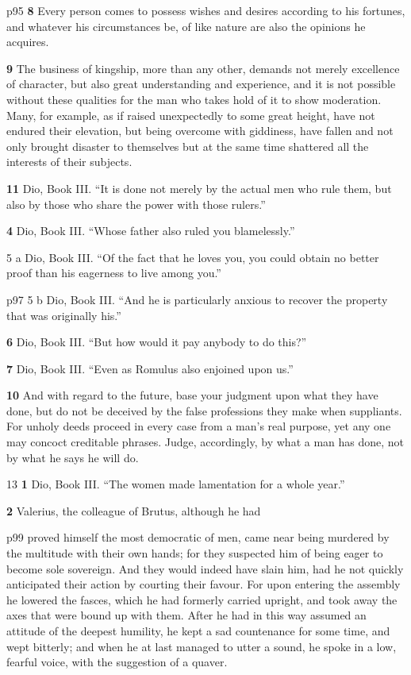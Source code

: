 p95
\textbf{8}
Every person comes to possess wishes and desires according to his fortunes, and whatever his circumstances be, of like nature are also the opinions he acquires.

\textbf{9}
The business of kingship, more than any other, demands not merely excellence of character, but also great understanding and experience, and it is not possible without these qualities for the man who takes hold of it to show moderation. Many, for example, as if raised unexpectedly to some great height, have not endured their elevation, but being overcome with giddiness, have fallen and not only brought disaster to themselves but at the same time shattered all the interests of their subjects.

\textbf{11}
Dio, Book III. ``It is done not merely by the actual men who rule them, but also by those who share the power with those rulers.''

\textbf{4}
Dio, Book III. ``Whose father also ruled you blamelessly.''

5 a Dio, Book III. ``Of the fact that he loves you, you could obtain no better proof than his eagerness to live among you.''

p97
5 b Dio, Book III. ``And he is particularly anxious to recover the property that was originally his.''

\textbf{6}
Dio, Book III. ``But how would it pay anybody to do this?''

\textbf{7}
Dio, Book III. ``Even as Romulus also enjoined upon us.''

\textbf{10}
And with regard to the future, base your judgment upon what they have done, but do not be deceived by the false professions they make when suppliants. For unholy deeds proceed in every case from a man's real purpose, yet any one may concoct creditable phrases. Judge, accordingly, by what a man has done, not by what he says he will do.

13
\textbf{1} Dio, Book III. ``The women made lamentation for a whole year.''

\textbf{2}
Valerius, the colleague of Brutus, although he had

p99 proved himself the most democratic of men, came near being murdered by the multitude with their own hands; for they suspected him of being eager to become sole sovereign. And they would indeed have slain him, had he not quickly anticipated their action by courting their favour. For upon entering the assembly he lowered the fasces, which he had formerly carried upright, and took away the axes that were bound up with them. After he had in this way assumed an attitude of the deepest humility, he kept a sad countenance for some time, and wept bitterly; and when he at last managed to utter a sound, he spoke in a low, fearful voice, with the suggestion of a quaver.

